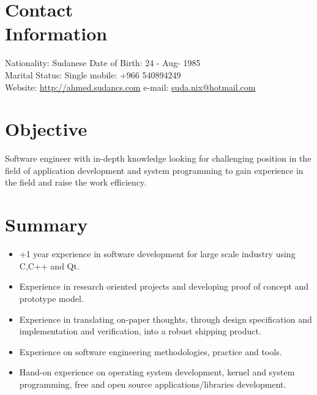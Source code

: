 \documentclass[margin,line,a4paper]{resume}
\begin{document}
\begin{resume}

    \section{\mysidestyle Contact\\Information}

    Nationality: Sudanese                            \hfill Date of Birth: 24 - Aug- 1985 \vspace{0mm}\\\vspace{0mm}%
   Marital Status: Single                              \hfill mobile: +966 540894249          \vspace{0mm}\\\vspace{0mm}%
    Website: \url{http://ahmed.sudancs.com}      \hfill e-mail: \href{mailto:suda.nix@hotmail.com}{suda.nix@hotmail.com}  \vspace{0mm}\\\vspace{-4.5mm}%

\section{\mysidestyle Objective}
Software engineer with in-depth knowledge looking for challenging position in the field of application development and system programming to gain experience in the field and raise the work efficiency.

    \section{\mysidestyle Summary}
\begin{itemize}
\item +1 year experience in software development for large scale industry using C,C++ and Qt.
\item Experience in research oriented projects and developing proof of concept and prototype model.
\item Experience in translating on-paper thoughts, through design specification and implementation and verification, into a robust shipping product.
\item Experience on software engineering methodologies, practice and tools.
\item Hand-on experience on operating system development, kernel and system programming, free and open source applications/libraries development.
\end{itemize}


\end{resume}
\end{document}
